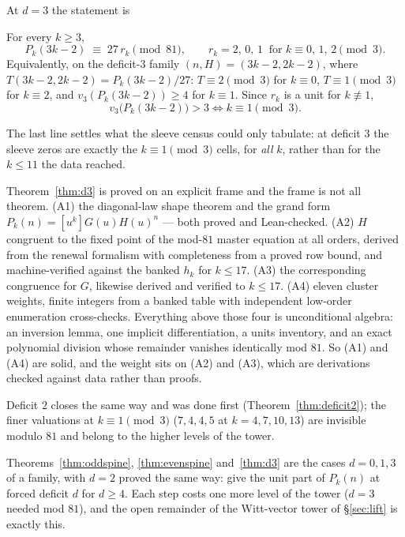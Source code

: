 \documentclass[11pt]{article}
\newcommand{\vthree}{v_3}
\begin{document}
At $d = 3$ the statement is
\begin{theorem}
\label{thm:d3}
For every $k \ge 3$,
\[
  P_k(3k-2) \;\equiv\; 27\,r_k \pmod{81},
  \qquad r_k = 2,\,0,\,1 \ \text{ for } k \equiv 0,\,1,\,2 \pmod 3 .
\]
Equivalently, on the deficit-$3$ family $(n,H) = (3k-2, 2k-2)$, where
$T(3k-2,2k-2) = P_k(3k-2)/27$: $T \equiv 2 \pmod 3$ for $k \equiv 0$,
$T \equiv 1 \pmod 3$ for $k \equiv 2$, and $\vthree(P_k(3k-2)) \ge 4$ for
$k \equiv 1$. Since $r_k$ is a unit for $k \not\equiv 1$,
\[
  \vthree\bigl(P_k(3k-2)\bigr) > 3 \iff k \equiv 1 \pmod 3 .
\]
\end{theorem}

The last line settles what the sleeve census could only tabulate: at deficit $3$
the sleeve zeros are exactly the $k \equiv 1 \pmod 3$ cells, for \emph{all} $k$,
rather than for the $k \le 11$ the data reached.

\begin{remark}
Theorem~\ref{thm:d3} is proved on an explicit frame and the frame is not all
theorem. (A1) the diagonal-law shape theorem and the grand form
$P_k(n) = [u^k]G(u)H(u)^n$ --- both proved and Lean-checked. (A2) $H$ congruent
to the fixed point of the mod-$81$ master equation at all orders, derived from
the renewal formalism with completeness from a proved row bound, and
machine-verified against the banked $h_k$ for $k \le 17$. (A3) the corresponding
congruence for $G$, likewise derived and verified to $k \le 17$. (A4) eleven
cluster weights, finite integers from a banked table with independent low-order
enumeration cross-checks. Everything above those four is unconditional algebra:
an inversion lemma, one implicit differentiation, a units inventory, and an exact
polynomial division whose remainder vanishes identically mod $81$. So (A1) and
(A4) are solid, and the weight sits on (A2) and (A3), which are derivations
checked against data rather than proofs.
\end{remark}

Deficit $2$ closes the same way and was done first
(Theorem~\ref{thm:deficit2}); the finer valuations at
$k \equiv 1 \pmod 3$ ($7, 4, 4, 5$ at $k = 4, 7, 10, 13$) are invisible
modulo $81$ and belong to the higher levels of the tower.

\begin{openproblem}
Theorems~\ref{thm:oddspine}, \ref{thm:evenspine} and~\ref{thm:d3} are the cases
$d = 0, 1, 3$ of a family, with $d = 2$ proved the same way: give the unit part
of $P_k(n)$ at forced deficit $d$ for $d \ge 4$. Each step costs one more level
of the tower ($d = 3$ needed mod $81$), and the open remainder of the
Witt-vector tower of \S\ref{sec:lift} is exactly this.
\end{openproblem}
\end{document}
